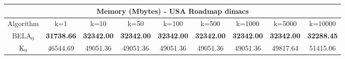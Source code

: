 \begin{tabular}{c|cccccccc}\toprule
\multicolumn{9}{c}{Memory (Mbytes) - USA Roadmap dimacs}\\ \midrule
Algorithm & k=1 & k=10 & k=50 & k=100 & k=500 & k=1000 & k=5000 & k=10000 \\ \midrule
BELA$_0$ & \textbf{31738.66} & \textbf{32342.00} & \textbf{32342.00} & \textbf{32342.00} & \textbf{32342.00} & \textbf{32342.00} & \textbf{32342.00} & \textbf{32288.45} \\
K$_0$ & 46544.69 & 49051.36 & 49051.36 & 49051.36 & 49051.36 & 49051.36 & 49817.64 & 51415.06 \\ \bottomrule 
\end{tabular}
